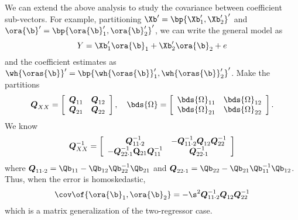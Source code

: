 We can extend the above analysis to study the covariance between coefficient sub-vectors. For example, partitioning $\Xb^\prime = \bp{\Xb_1^\prime, \Xb_2^\prime}^\prime$ and $\ora{\b}^\prime = \bp{\ora{\b}_1^\prime, \ora{\b}_2^\prime}^\prime$, we can write the general model as 
\begin{equation}
    \notag
    Y = \Xb_1^\prime \ora{\b}_1 + \Xb_2^\prime \ora{\b}_2 + e
\end{equation}
and the coefficient estimates as $\wh{\oras{\b}}^\prime = \bp{\wh{\oras{\b}}_1^\prime, \wh{\oras{\b}}_2^\prime}^\prime$. Make the partitions 
\begin{equation}
    \notag
    \boldsymbol{Q}_{X X}=\left[\begin{array}{ll}
    \boldsymbol{Q}_{11} & \boldsymbol{Q}_{12} \\
    \boldsymbol{Q}_{21} & \boldsymbol{Q}_{22}
    \end{array}\right], \quad \bds{\Omega}=\left[\begin{array}{ll}
        \bds{\Omega}_{11} & \bds{\Omega}_{12} \\
        \bds{\Omega}_{21} & \bds{\Omega}_{22}
    \end{array}\right] . 
\end{equation}
We know 
\begin{equation}
    \notag
    \boldsymbol{Q}_{X X}^{-1}=\left[\begin{array}{cc}
        \boldsymbol{Q}_{11 \cdot 2}^{-1} & -\boldsymbol{Q}_{11 \cdot 2}^{-1} \boldsymbol{Q}_{12} \boldsymbol{Q}_{22}^{-1} \\
        -\boldsymbol{Q}_{22 \cdot 1}^{-1} \mathbf{Q}_{21} \boldsymbol{Q}_{11}^{-1} & \boldsymbol{Q}_{22 \cdot 1}^{-1}
        \end{array}\right]
\end{equation}
where $\boldsymbol{Q}_{11 \cdot 2} = \Qb_{11} - \Qb_{12} \Qb_{22}^{-1} \Qb_{21}$ and $\boldsymbol{Q}_{22 \cdot 1} = \Qb_{22} - \Qb_{21} \Qb_{11}^{-1} \Qb_{12}$. Thus, when the error is homoskedastic,
\begin{equation}
    \notag
    \cov\of{\ora{\b}_1, \ora{\b}_2} = - \s^2 \boldsymbol{Q}_{11 \cdot 2}^{-1} \boldsymbol{Q}_{12} \boldsymbol{Q}_{22}^{-1}
\end{equation}
which is a matrix generalization of the two-regressor case.

